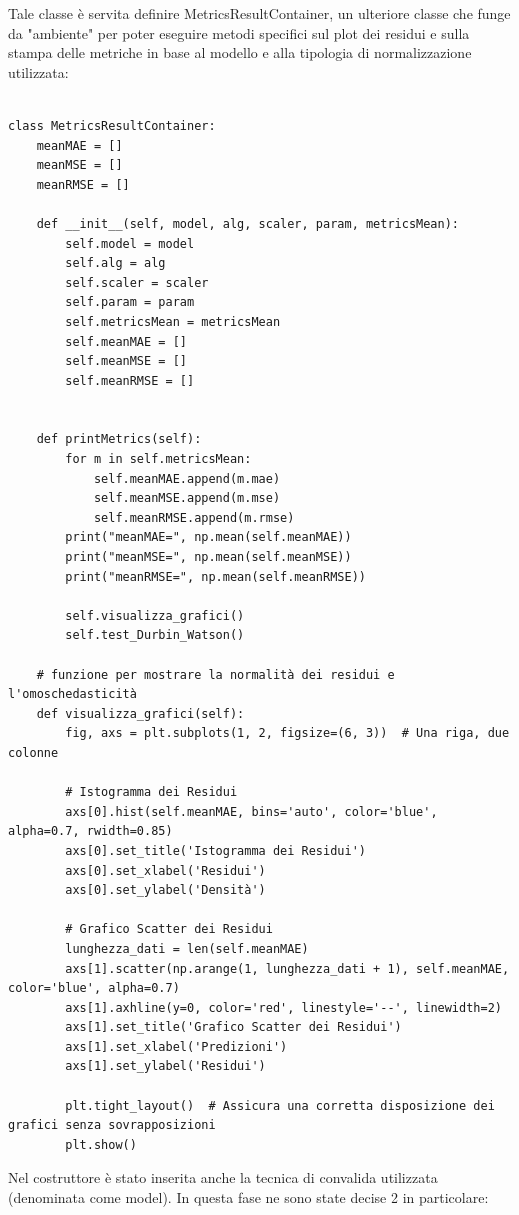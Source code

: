 Tale classe è servita definire MetricsResultContainer, un ulteriore classe che funge da "ambiente" per poter eseguire metodi specifici sul plot dei residui e sulla stampa delle metriche in base al modello e alla tipologia di normalizzazione utilizzata: \\
\begin{lstlisting}[caption=MetricsResultContainer]

class MetricsResultContainer:
    meanMAE = []
    meanMSE = []
    meanRMSE = []

    def __init__(self, model, alg, scaler, param, metricsMean):
        self.model = model
        self.alg = alg
        self.scaler = scaler
        self.param = param
        self.metricsMean = metricsMean
        self.meanMAE = []
        self.meanMSE = []
        self.meanRMSE = []
        

    def printMetrics(self):
        for m in self.metricsMean:
            self.meanMAE.append(m.mae)
            self.meanMSE.append(m.mse)
            self.meanRMSE.append(m.rmse)
        print("meanMAE=", np.mean(self.meanMAE))
        print("meanMSE=", np.mean(self.meanMSE))
        print("meanRMSE=", np.mean(self.meanRMSE))
        
        self.visualizza_grafici()
        self.test_Durbin_Watson()

    # funzione per mostrare la normalità dei residui e l'omoschedasticità
    def visualizza_grafici(self):
        fig, axs = plt.subplots(1, 2, figsize=(6, 3))  # Una riga, due colonne

        # Istogramma dei Residui
        axs[0].hist(self.meanMAE, bins='auto', color='blue', alpha=0.7, rwidth=0.85)
        axs[0].set_title('Istogramma dei Residui')
        axs[0].set_xlabel('Residui')
        axs[0].set_ylabel('Densità')

        # Grafico Scatter dei Residui
        lunghezza_dati = len(self.meanMAE)
        axs[1].scatter(np.arange(1, lunghezza_dati + 1), self.meanMAE, color='blue', alpha=0.7)
        axs[1].axhline(y=0, color='red', linestyle='--', linewidth=2)
        axs[1].set_title('Grafico Scatter dei Residui')
        axs[1].set_xlabel('Predizioni')
        axs[1].set_ylabel('Residui')

        plt.tight_layout()  # Assicura una corretta disposizione dei grafici senza sovrapposizioni
        plt.show()
\end{lstlisting}
Nel costruttore è stato inserita anche la tecnica di convalida utilizzata (denominata come model). In questa fase ne sono state decise 2 in particolare:
